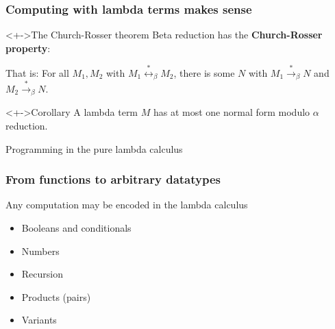 \documentclass[pdftex,aspectratio=169]{beamer}
\begin{document}
\begin{frame}[fragile]
  \frametitle{Computing with lambda terms makes sense}
  \begin{alertblock}<+->{The Church-Rosser theorem}
    Beta reduction has the \textbf{Church-Rosser property}:
    \begin{center}
    \end{center}
    That is: For
    all $M_1, M_2$ with
  $M_1 \overset{\ast}{\leftrightarrow}_\beta M_2$,
  there is some $N$ with
  $M_1\overset{\ast}{\rightarrow}_\beta N$ and
  $M_2\overset{\ast}{\rightarrow}_\beta N$.
\end{alertblock}
\begin{block}<+->{Corollary}
  A lambda term $M$ has at most one normal form modulo $\alpha$
  reduction.
\end{block}
\end{frame}


\begin{frame}[fragile]
  \Huge
  \begin{center}
    {Programming in the pure lambda calculus}
  \end{center}
\end{frame}



\begin{frame}[fragile]
  \frametitle{From functions to arbitrary datatypes}
  \begin{block}{Any computation may be encoded in the lambda calculus}
    \begin{itemize}
    \item Booleans and conditionals
    \item Numbers
    \item Recursion
    \item Products (pairs)
    \item Variants
    \end{itemize}
  \end{block}
\end{frame}             
\end{document}

